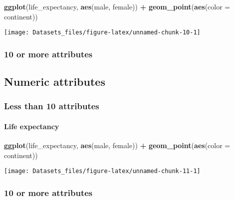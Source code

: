 \documentclass[]{article}
\newenvironment{Shaded}{\begin{snugshade}}{\end{snugshade}}
\newcommand{\DataTypeTok}[1]{\textcolor[rgb]{0.13,0.29,0.53}{#1}}
\newcommand{\KeywordTok}[1]{\textcolor[rgb]{0.13,0.29,0.53}{\textbf{#1}}}
\newcommand{\NormalTok}[1]{#1}
\newcommand{\OperatorTok}[1]{\textcolor[rgb]{0.81,0.36,0.00}{\textbf{#1}}}
\newcommand{\StringTok}[1]{\textcolor[rgb]{0.31,0.60,0.02}{#1}}
\let\oldparagraph\paragraph
\renewcommand{\paragraph}[1]{\oldparagraph{#1}\mbox{}}
\begin{document}
\begin{Shaded}
\begin{Highlighting}[]
\KeywordTok{ggplot}\NormalTok{(life_expectancy, }\KeywordTok{aes}\NormalTok{(male, female)) }\OperatorTok{+}\StringTok{ }
\StringTok{  }\KeywordTok{geom_point}\NormalTok{(}\KeywordTok{aes}\NormalTok{(}\DataTypeTok{color =}\NormalTok{ continent)) }
\end{Highlighting}
\end{Shaded}

\texttt{[image: Datasets\_files/figure-latex/unnamed-chunk-10-1]}

\hypertarget{or-more-attributes-4}{%
\subsubsection{10 or more attributes}\label{or-more-attributes-4}}

\hypertarget{numeric-attributes-1}{%
\subsection{Numeric attributes}\label{numeric-attributes-1}}

\hypertarget{less-than-10-attributes-5}{%
\subsubsection{Less than 10
attributes}\label{less-than-10-attributes-5}}

\hypertarget{life-expectancy-1}{%
\paragraph{Life expectancy}\label{life-expectancy-1}}

\begin{Shaded}
\begin{Highlighting}[]
\KeywordTok{ggplot}\NormalTok{(life_expectancy, }\KeywordTok{aes}\NormalTok{(male, female)) }\OperatorTok{+}\StringTok{ }
\StringTok{  }\KeywordTok{geom_point}\NormalTok{(}\KeywordTok{aes}\NormalTok{(}\DataTypeTok{color =}\NormalTok{ continent)) }
\end{Highlighting}
\end{Shaded}

\texttt{[image: Datasets\_files/figure-latex/unnamed-chunk-11-1]}

\hypertarget{or-more-attributes-5}{%
\subsubsection{10 or more attributes}\label{or-more-attributes-5}}
\end{document}
